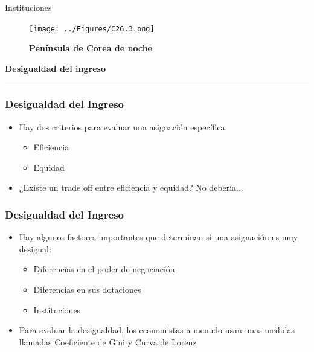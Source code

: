 \documentclass{beamer}
\begin{document}
\begin{frame}{Instituciones}
    \begin{figure}[H]
\begin{center}
\texttt{[image: ../Figures/C26.3.png]}
\end{center}
\caption{\textbf{Península de Corea de noche}}
\label{fig:korea}
\end{figure}
\end{frame}

\begin{frame}{}
\centering\huge\textbf{Desigualdad del ingreso} 
\vspace{2mm}
\hrule
\end{frame}

\begin{frame} 
\frametitle{Desigualdad del Ingreso}
\begin{itemize}
\item Hay dos criterios para evaluar una asignación específica: 
\begin{itemize}
    \item Eficiencia
    \item Equidad
\end{itemize}
\item ¿Existe un trade off entre eficiencia y equidad? No debería...
\end{itemize}
\end{frame}


\begin{frame} 
\frametitle{Desigualdad del Ingreso}
\begin{itemize}
\item Hay algunos factores importantes que determinan si una asignación es muy desigual: \begin{itemize}
    \item Diferencias en el poder de negociación
    \item Diferencias en sus dotaciones
    \item Instituciones
\end{itemize}
\item Para evaluar la desigualdad, los economistas a menudo usan unas medidas llamadas Coeficiente de Gini y Curva de Lorenz
\end{itemize}
\end{frame}
\end{document}
